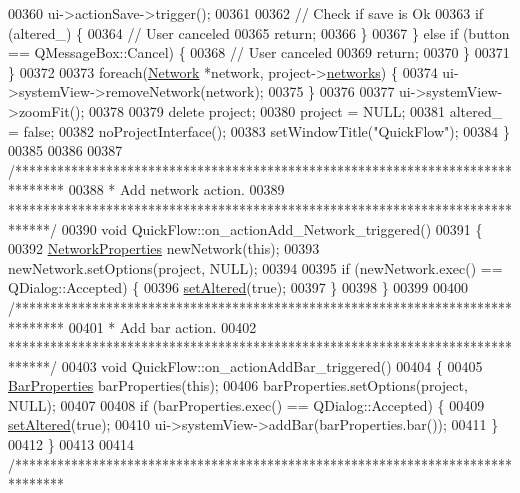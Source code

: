 \begin{DoxyCode}
00360       ui->actionSave->trigger();
00361 
00362       \textcolor{comment}{// Check if save is Ok}
00363       \textcolor{keywordflow}{if} (altered\_) \{
00364         \textcolor{comment}{// User canceled}
00365         \textcolor{keywordflow}{return};
00366       \}
00367     \} \textcolor{keywordflow}{else} \textcolor{keywordflow}{if} (button == QMessageBox::Cancel) \{
00368       \textcolor{comment}{// User canceled}
00369       \textcolor{keywordflow}{return};
00370     \}
00371   \}
00372 
00373   \textcolor{keywordflow}{foreach}(\hyperlink{class_network}{Network} *network, project->\hyperlink{class_project_aa98126154cab59769a431668e6f17daf}{networks}) \{
00374     ui->systemView->removeNetwork(network);
00375   \}
00376 
00377   ui->systemView->zoomFit();
00378 
00379   \textcolor{keyword}{delete} project;
00380   project = NULL;
00381   altered\_ = \textcolor{keyword}{false};
00382   noProjectInterface();
00383   setWindowTitle(\textcolor{stringliteral}{"QuickFlow"});
00384 \}
00385 
00386 
00387 \textcolor{comment}{/*******************************************************************************}
00388 \textcolor{comment}{* Add network action.}
00389 \textcolor{comment}{******************************************************************************/}
00390 \textcolor{keywordtype}{void} QuickFlow::on\_actionAdd\_Network\_triggered()
00391 \{
00392   \hyperlink{class_network_properties}{NetworkProperties} newNetwork(\textcolor{keyword}{this});
00393   newNetwork.setOptions(project, NULL);
00394 
00395   \textcolor{keywordflow}{if} (newNetwork.exec() == QDialog::Accepted) \{
00396     \hyperlink{group___window_ga4b63ea5ca52a9eea14db0a22b5a133f8}{setAltered}(\textcolor{keyword}{true});
00397   \}
00398 \}
00399 
00400 \textcolor{comment}{/*******************************************************************************}
00401 \textcolor{comment}{ * Add bar action.}
00402 \textcolor{comment}{ ******************************************************************************/}
00403 \textcolor{keywordtype}{void} QuickFlow::on\_actionAddBar\_triggered()
00404 \{
00405   \hyperlink{class_bar_properties}{BarProperties} barProperties(\textcolor{keyword}{this});
00406   barProperties.setOptions(project, NULL);
00407 
00408   \textcolor{keywordflow}{if} (barProperties.exec() == QDialog::Accepted) \{
00409     \hyperlink{group___window_ga4b63ea5ca52a9eea14db0a22b5a133f8}{setAltered}(\textcolor{keyword}{true});
00410     ui->systemView->addBar(barProperties.bar());
00411   \}
00412 \}
00413 
00414 \textcolor{comment}{/*******************************************************************************}

\end{DoxyCode}
